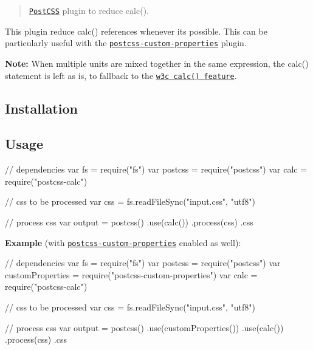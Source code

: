 \begin{quote}
\href{https://github.com/postcss/postcss}{\tt Post\+C\+SS} plugin to reduce {\ttfamily calc()}. \end{quote}


This plugin reduce {\ttfamily calc()} references whenever it\textquotesingle{}s possible. This can be particularly useful with the \href{https://github.com/postcss/postcss-custom-properties}{\tt postcss-\/custom-\/properties} plugin.

{\bfseries Note\+:} When multiple units are mixed together in the same expression, the {\ttfamily calc()} statement is left as is, to fallback to the \href{http://www.w3.org/TR/css3-values/#calc}{\tt w3c calc() feature}.

\subsection*{Installation}




\subsection*{Usage}


\begin{DoxyCode}
// dependencies
var fs = require("fs")
var postcss = require("postcss")
var calc = require("postcss-calc")

// css to be processed
var css = fs.readFileSync("input.css", "utf8")

// process css
var output = postcss()
  .use(calc())
  .process(css)
  .css
\end{DoxyCode}


{\bfseries Example} (with \href{https://github.com/postcss/postcss-custom-properties}{\tt postcss-\/custom-\/properties} enabled as well)\+:


\begin{DoxyCode}
// dependencies
var fs = require("fs")
var postcss = require("postcss")
var customProperties = require("postcss-custom-properties")
var calc = require("postcss-calc")

// css to be processed
var css = fs.readFileSync("input.css", "utf8")

// process css
var output = postcss()
  .use(customProperties())
  .use(calc())
  .process(css)
  .css
\end{DoxyCode}


